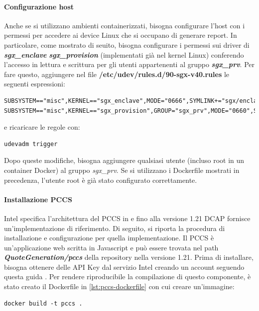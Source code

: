 \documentclass{article}
\begin{document}
\paragraph{Configurazione host}
Anche se si utilizzano ambienti containerizzati, bisogna configurare l'host con i permessi per accedere ai device Linux che si occupano di generare report. In particolare, come mostrato di seuito, bisogna configurare i permessi sui driver di \textbf{\textit{sgx\_enclave}} \textbf{\textit{sgx\_provision}} (implementati già nel kernel Linux) conferendo l'accesso in lettura e scrittura per gli utenti appartenenti al gruppo \textbf{\textit{sgx\_prv}}. Per fare questo, aggiungere nel file \textbf{/etc/udev/rules.d/90-sgx-v40.rules} le seguenti espressioni:
\begin{verbatim}
SUBSYSTEM=="misc",KERNEL=="sgx_enclave",MODE="0666",SYMLINK+="sgx/enclave"
SUBSYSTEM=="misc",KERNEL=="sgx_provision",GROUP="sgx_prv",MODE="0660",SYMLINK+="sgx/provision"
\end{verbatim}
e ricaricare le regole con:
\begin{verbatim}
udevadm trigger
\end{verbatim}

Dopo queste modifiche, bisogna aggiungere qualsiasi utente (incluso root in un container Docker) al gruppo \textit{sgx\_prv}. Se si utilizzano i Dockerfile mostrati in precedenza, l'utente root è già stato configurato correttamente. 
  
\paragraph{Installazione PCCS}
Intel specifica l'architettura del PCCS in e fino alla versione 1.21 DCAP fornisce\\ un'implementazione di riferimento. Di seguito, si riporta la procedura di installazione e configurazione per quella implementazione.
Il PCCS è un'applicazione web scritta in Javascript e può essere trovata nel path \textbf{\textit{QuoteGeneration/pccs}} della repository nella versione 1.21. Prima di installare, bisogna ottenere delle API Key dal servizio Intel creando un account seguendo questa guida \cite{quickstart-dcap}. Per rendere riproducibile la compilazione di questo componente, è stato creato il Dockerfile in \cref{lst:pccs-dockerfile} con cui creare un'immagine:
\begin{verbatim}
docker build -t pccs . 
\end{verbatim}


\end{document}
